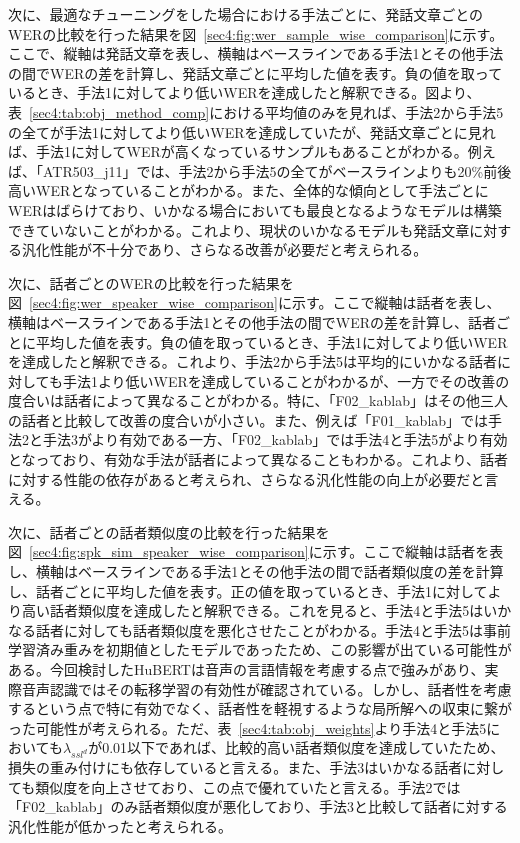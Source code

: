 \documentclass[12pt]{jarticle}
\numberwithin{equation}{section}    %
\numberwithin{figure}{section}      %
\numberwithin{table}{section}      %
\begin{document}
次に、最適なチューニングをした場合における手法ごとに、発話文章ごとのWERの比較を行った結果を図~\ref{sec4:fig:wer_sample_wise_comparison}に示す。ここで、縦軸は発話文章を表し、横軸はベースラインである手法1とその他手法の間でWERの差を計算し、発話文章ごとに平均した値を表す。負の値を取っているとき、手法1に対してより低いWERを達成したと解釈できる。図より、表~\ref{sec4:tab:obj_method_comp}における平均値のみを見れば、手法2から手法5の全てが手法1に対してより低いWERを達成していたが、発話文章ごとに見れば、手法1に対してWERが高くなっているサンプルもあることがわかる。例えば、「ATR503\_j11」では、手法2から手法5の全てがベースラインよりも20\%前後高いWERとなっていることがわかる。また、全体的な傾向として手法ごとにWERはばらけており、いかなる場合においても最良となるようなモデルは構築できていないことがわかる。これより、現状のいかなるモデルも発話文章に対する汎化性能が不十分であり、さらなる改善が必要だと考えられる。

次に、話者ごとのWERの比較を行った結果を図~\ref{sec4:fig:wer_speaker_wise_comparison}に示す。ここで縦軸は話者を表し、横軸はベースラインである手法1とその他手法の間でWERの差を計算し、話者ごとに平均した値を表す。負の値を取っているとき、手法1に対してより低いWERを達成したと解釈できる。これより、手法2から手法5は平均的にいかなる話者に対しても手法1より低いWERを達成していることがわかるが、一方でその改善の度合いは話者によって異なることがわかる。特に、「F02\_kablab」はその他三人の話者と比較して改善の度合いが小さい。また、例えば「F01\_kablab」では手法2と手法3がより有効である一方、「F02\_kablab」では手法4と手法5がより有効となっており、有効な手法が話者によって異なることもわかる。これより、話者に対する性能の依存があると考えられ、さらなる汎化性能の向上が必要だと言える。

次に、話者ごとの話者類似度の比較を行った結果を図~\ref{sec4:fig:spk_sim_speaker_wise_comparison}に示す。ここで縦軸は話者を表し、横軸はベースラインである手法1とその他手法の間で話者類似度の差を計算し、話者ごとに平均した値を表す。正の値を取っているとき、手法1に対してより高い話者類似度を達成したと解釈できる。これを見ると、手法4と手法5はいかなる話者に対しても話者類似度を悪化させたことがわかる。手法4と手法5は事前学習済み重みを初期値としたモデルであったため、この影響が出ている可能性がある。今回検討したHuBERTは音声の言語情報を考慮する点で強みがあり、実際音声認識ではその転移学習の有効性が確認されている。しかし、話者性を考慮するという点で特に有効でなく、話者性を軽視するような局所解への収束に繋がった可能性が考えられる。ただ、表~\ref{sec4:tab:obj_weights}より手法4と手法5においても$\lambda_{ssl^{d}}$が0.01以下であれば、比較的高い話者類似度を達成していたため、損失の重み付けにも依存していると言える。また、手法3はいかなる話者に対しても類似度を向上させており、この点で優れていたと言える。手法2では「F02\_kablab」のみ話者類似度が悪化しており、手法3と比較して話者に対する汎化性能が低かったと考えられる。
\end{document}
